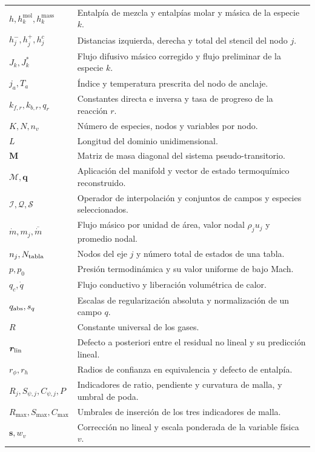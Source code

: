 \documentclass[12pt,a4paper,twoside,openany]{book}
\newcommand{\vect}[1]{\bm{#1}}
\newcommand{\mat}[1]{\bm{#1}}
\begin{document}
\begin{longtable}{@{}p{}p{}@{}}
\(h,h_k^{\mathrm{mol}},h_k^{\mathrm{mass}}\) & Entalpía de mezcla y entalpías molar y másica de la especie \(k\). \\
\(h_j^-,h_j^+,h_j^c\) & Distancias izquierda, derecha y total del stencil del nodo \(j\). \\
\(J_k,J_k^*\) & Flujo difusivo másico corregido y flujo preliminar de la especie \(k\). \\
\(j_a,T_a\) & Índice y temperatura prescrita del nodo de anclaje. \\
\(k_{f,r},k_{b,r},q_r\) & Constantes directa e inversa y tasa de progreso de la reacción \(r\). \\
\(K,N,n_v\) & Número de especies, nodos y variables por nodo. \\
\(L\) & Longitud del dominio unidimensional. \\
\(\mat M\) & Matriz de masa diagonal del sistema pseudo-transitorio. \\
\(\mathcal M,\vect q\) & Aplicación del manifold y vector de estado termoquímico reconstruido. \\
\(\mathcal I,\mathcal Q,\mathcal S\) & Operador de interpolación y conjuntos de campos y especies seleccionados. \\
\(\dot m,m_j,\overline{\dot m}\) & Flujo másico por unidad de área, valor nodal \(\rho_j u_j\) y promedio nodal. \\
\(n_j,N_{\rm tabla}\) & Nodos del eje \(j\) y número total de estados de una tabla. \\
\(p,p_0\) & Presión termodinámica y su valor uniforme de bajo Mach. \\
\(q_c,\dot q\) & Flujo conductivo y liberación volumétrica de calor. \\
\(q_{\rm abs},s_q\) & Escalas de regularización absoluta y normalización de un campo \(q\). \\
\(R\) & Constante universal de los gases. \\
\(\vect r_{\rm lin}\) & Defecto a posteriori entre el residual no lineal y su predicción lineal. \\
\(r_\phi,r_h\) & Radios de confianza en equivalencia y defecto de entalpía. \\
\(R_j,S_{\psi,j},C_{\psi,j},P\) & Indicadores de ratio, pendiente y curvatura de malla, y umbral de poda. \\
\(R_{\max},S_{\max},C_{\max}\) & Umbrales de inserción de los tres indicadores de malla. \\
\(\vect s,w_v\) & Corrección no lineal y escala ponderada de la variable física \(v\). \\

\end{longtable}
\end{document}
